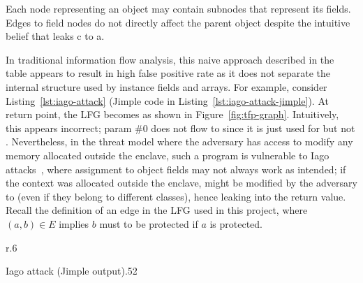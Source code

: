Each node representing an object may contain subnodes that represent its fields. 
Edges to field nodes do not directly affect the parent object
despite the intuitive belief that  leaks \code c to \code a.

In traditional information flow analysis,
this naive approach described in the table appears to result in high false positive rate
as it does not separate the internal structure used by instance fields and arrays.
For example, consider Listing~\ref{lst:iago-attack}
(Jimple code in Listing~\ref{lst:iago-attack-jimple}).
At return point, the \ac{LFG} becomes as shown in Figure~\ref{fig:tfp-graph}.
Intuitively, this appears incorrect;
param \#0 does not flow to 
since it is just used for  but not .
Nevertheless, in the threat model where
the adversary has access to modify any memory allocated outside the enclave,
such a program is vulnerable to Iago attacks~\cite{iago},
where assignment to object fields may not always work as intended;
if the  context was allocated outside the enclave,
 might be modified by the adversary to 
(even if they belong to different classes),
hence leaking into the return value.
Recall the definition of an edge in the \ac{LFG} used in this project,
where $(a, b) \in E$ implies $b$ must to be protected if $a$ is protected.

\begin{wrapfigure}{r}{.6\textwidth}
	\vspace{-2em}
	\caption{\ac{LFG} of  in Listing~\ref{lst:iago-attack}}
	\begin{center}
	\end{center}
	\vspace{-2em}
	\label{fig:tfp-graph}
\end{wrapfigure}

{Iago attack (Jimple output)}{.5}{2}

